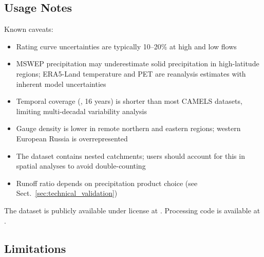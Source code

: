 \subsection{Usage Notes}

Known caveats:
\begin{itemize}
    \item Rating curve uncertainties are typically 10--20\% at high and low flows
    \item MSWEP precipitation may underestimate solid precipitation in high-latitude regions; ERA5-Land temperature and PET are reanalysis estimates with inherent model uncertainties
    \item Temporal coverage (\years, 16 years) is shorter than most CAMELS datasets, limiting multi-decadal variability analysis
    \item Gauge density is lower in remote northern and eastern regions; western European Russia is overrepresented
    \item The dataset contains nested catchments; users should account for this in spatial analyses to avoid double-counting
    \item Runoff ratio depends on precipitation product choice (see Sect.~\ref{sec:technical_validation})
\end{itemize}

The dataset is publicly available under \license license at .
Processing code is available at .

\subsection{Limitations}
\label{sec:limitations}

